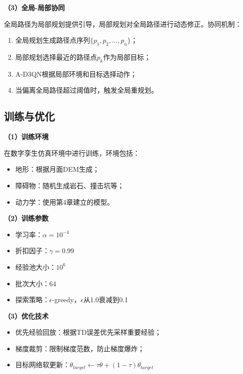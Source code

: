 \textbf{（3）全局-局部协同}

全局路径为局部规划提供引导，局部规划对全局路径进行动态修正。协同机制：

\begin{enumerate}
    \item 全局规划生成路径点序列$\{p_1, p_2, \ldots, p_n\}$；
    \item 局部规划选择最近的路径点$p_k$作为局部目标；
    \item A-D3QN根据局部环境和目标选择动作；
    \item 当偏离全局路径超过阈值时，触发全局重规划。
\end{enumerate}

\subsection{训练与优化}
\label{subsec:training}

\textbf{（1）训练环境}

在数字孪生仿真环境中进行训练，环境包括：
\begin{itemize}
    \item 地形：根据月面DEM生成；
    \item 障碍物：随机生成岩石、撞击坑等；
    \item 动力学：使用第4章建立的模型。
\end{itemize}

\textbf{（2）训练参数}

\begin{itemize}
    \item 学习率：$\alpha = 10^{-4}$
    \item 折扣因子：$\gamma = 0.99$
    \item 经验池大小：$10^6$
    \item 批次大小：64
    \item 探索策略：$\epsilon$-greedy，$\epsilon$从1.0衰减到0.1
\end{itemize}

\textbf{（3）优化技术}

\begin{itemize}
    \item 优先经验回放：根据TD误差优先采样重要经验；
    \item 梯度裁剪：限制梯度范数，防止梯度爆炸；
    \item 目标网络软更新：$\theta_{target} \leftarrow \tau\theta + (1-\tau)\theta_{target}$
\end{itemize}
